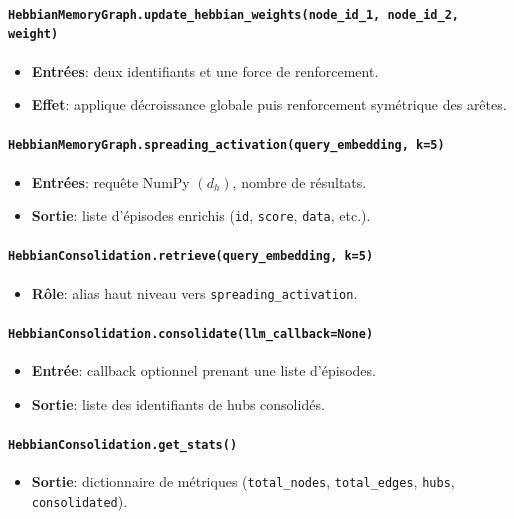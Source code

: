\documentclass[12pt,a4paper]{article}
\begin{document}
\paragraph{\texttt{HebbianMemoryGraph.update\_hebbian\_weights(node\_id\_1, node\_id\_2, weight)}}
\begin{itemize}[leftmargin=*]
    \item \textbf{Entrées}: deux identifiants et une force de renforcement.
    \item \textbf{Effet}: applique décroissance globale puis renforcement symétrique des arêtes.
\end{itemize}

\paragraph{\texttt{HebbianMemoryGraph.spreading\_activation(query\_embedding, k=5)}}
\begin{itemize}[leftmargin=*]
    \item \textbf{Entrées}: requête NumPy $(d_h)$, nombre de résultats.
    \item \textbf{Sortie}: liste d'épisodes enrichis (\texttt{id}, \texttt{score}, \texttt{data}, etc.).
\end{itemize}

\paragraph{\texttt{HebbianConsolidation.retrieve(query\_embedding, k=5)}}
\begin{itemize}[leftmargin=*]
    \item \textbf{Rôle}: alias haut niveau vers \texttt{spreading\_activation}.
\end{itemize}

\paragraph{\texttt{HebbianConsolidation.consolidate(llm\_callback=None)}}
\begin{itemize}[leftmargin=*]
    \item \textbf{Entrée}: callback optionnel prenant une liste d'épisodes.
    \item \textbf{Sortie}: liste des identifiants de hubs consolidés.
\end{itemize}

\paragraph{\texttt{HebbianConsolidation.get\_stats()}}
\begin{itemize}[leftmargin=*]
    \item \textbf{Sortie}: dictionnaire de métriques (\texttt{total\_nodes}, \texttt{total\_edges}, \texttt{hubs}, \texttt{consolidated}).
\end{itemize}
\end{document}
